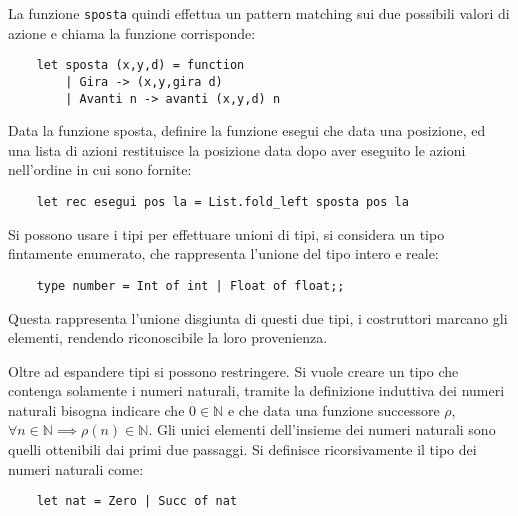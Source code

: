 \documentclass{article}
\numberwithin{equation}{subsection}
\begin{document}
La funzione \verb|sposta| quindi effettua un pattern matching sui due possibili valori di azione e chiama la funzione corrisponde:
\begin{verbatim}
    let sposta (x,y,d) = function
        | Gira -> (x,y,gira d)
        | Avanti n -> avanti (x,y,d) n
\end{verbatim}


Data la funzione sposta, definire la funzione esegui che data una posizione, ed una lista di azioni restituisce la posizione data dopo aver eseguito le azioni nell'ordine in cui sono fornite:
\begin{verbatim}
    let rec esegui pos la = List.fold_left sposta pos la
\end{verbatim}



Si possono usare i tipi per effettuare unioni di tipi, si considera un tipo fintamente enumerato, che rappresenta l'unione del tipo intero e reale:
\begin{verbatim}
    type number = Int of int | Float of float;; 
\end{verbatim}
Questa rappresenta l'unione disgiunta di questi due tipi, i costruttori marcano gli elementi, rendendo riconoscibile la loro provenienza. 

Oltre ad espandere tipi si possono restringere. Si vuole creare un tipo che contenga solamente i numeri naturali, tramite la definizione induttiva dei numeri naturali bisogna indicare che $0\in\mathbb{N}$ e che data una funzione successore $\rho$, $\forall n\in\mathbb{N}\implies \rho(n)\in\mathbb{N}$. Gli unici elementi dell'insieme dei numeri naturali sono quelli ottenibili dai primi due passaggi. Si definisce ricorsivamente il tipo dei numeri naturali come:
\begin{verbatim}
    let nat = Zero | Succ of nat    
\end{verbatim}


\end{document}
